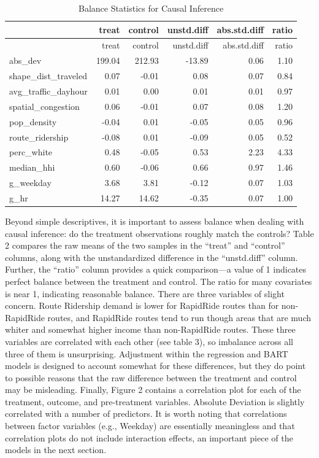 \documentclass[
  12pt,
]{article}
\begin{document}
\begin{longtable}[]{@{}lrrrrr@{}}
\caption{Balance Statistics for Causal Inference}\tabularnewline
\toprule\noalign{}
& treat & control & unstd.diff & abs.std.diff & ratio \\
\midrule\noalign{}
\endfirsthead
\toprule\noalign{}
& treat & control & unstd.diff & abs.std.diff & ratio \\
\midrule\noalign{}
\endhead
\bottomrule\noalign{}
\endlastfoot
abs\_dev & 199.04 & 212.93 & -13.89 & 0.06 & 1.10 \\
shape\_dist\_traveled & 0.07 & -0.01 & 0.08 & 0.07 & 0.84 \\
avg\_traffic\_dayhour & 0.01 & 0.00 & 0.01 & 0.01 & 0.97 \\
spatial\_congestion & 0.06 & -0.01 & 0.07 & 0.08 & 1.20 \\
pop\_density & -0.04 & 0.01 & -0.05 & 0.05 & 0.96 \\
route\_ridership & -0.08 & 0.01 & -0.09 & 0.05 & 0.52 \\
perc\_white & 0.48 & -0.05 & 0.53 & 2.23 & 4.33 \\
median\_hhi & 0.60 & -0.06 & 0.66 & 0.97 & 1.46 \\
g\_weekday & 3.68 & 3.81 & -0.12 & 0.07 & 1.03 \\
g\_hr & 14.27 & 14.62 & -0.35 & 0.07 & 1.00 \\
\end{longtable}

Beyond simple descriptives, it is important to assess balance when
dealing with causal inference: do the treatment observations roughly
match the controls? Table 2 compares the raw means of the two samples in
the ``treat'' and ``control'' columns, along with the unstandardized
difference in the ``unstd.diff'' column. Further, the ``ratio'' column
provides a quick comparison---a value of 1 indicates perfect balance
between the treatment and control. The ratio for many covariates is near
1, indicating reasonable balance. There are three variables of slight
concern. Route Ridership demand is lower for RapidRide routes than for
non-RapidRide routes, and RapidRide routes tend to run though areas that
are much whiter and somewhat higher income than non-RapidRide routes.
These three variables are correlated with each other (see table 3), so
imbalance across all three of them is unsurprising. Adjustment within
the regression and BART models is designed to account somewhat for these
differences, but they do point to possible reasons that the raw
difference between the treatment and control may be misleading. Finally,
Figure 2 contains a correlation plot for each of the treatment, outcome,
and pre-treatment variables. Absolute Deviation is slightly correlated
with a number of predictors. It is worth noting that correlations
between factor variables (e.g., Weekday) are essentially meaningless and
that correlation plots do not include interaction effects, an important
piece of the models in the next section.
\end{document}
